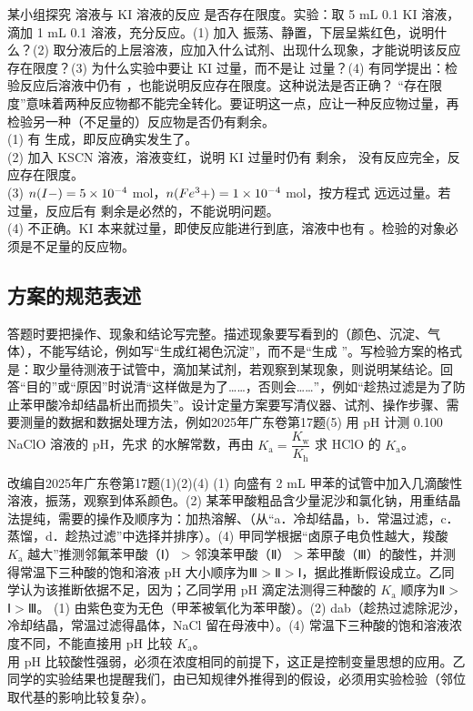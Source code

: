 \begin{liti}[综合·反应限度的探究]
某小组探究  溶液与 KI 溶液的反应  是否存在限度。实验：取 5 mL 0.1\molL{} KI 溶液，滴加 1 mL 0.1\molL{}  溶液，充分反应。(1) 加入  振荡、静置，下层呈紫红色，说明什么？(2) 取分液后的上层溶液，应加入什么试剂、出现什么现象，才能说明该反应存在限度？(3) 为什么实验中要让 KI 过量，而不是让  过量？(4) 有同学提出：检验反应后溶液中仍有 ，也能说明反应存在限度。这种说法是否正确？
\tcblower
\silu “存在限度”意味着两种反应物都不能完全转化。要证明这一点，应让一种反应物过量，再检验另一种（不足量的）反应物是否仍有剩余。\\
\jie (1) 有  生成，即反应确实发生了。\\
(2) 加入 KSCN 溶液，溶液变红，说明 KI 过量时仍有  剩余， 没有反应完全，反应存在限度。\\
(3) $n(I-)=5\times10^{-4}$ mol，$n(Fe^3+)=1\times10^{-4}$ mol，按方程式  远远过量。若  过量，反应后有  剩余是必然的，不能说明问题。\\
(4) 不正确。KI 本来就过量，即使反应能进行到底，溶液中也有 。检验的对象必须是不足量的反应物。
\end{liti}

\subsection{方案的规范表述}

答题时要把操作、现象和结论写完整。描述现象要写看到的（颜色、沉淀、气体），不能写结论，例如写“生成红褐色沉淀”，而不是“生成 ”。写检验方案的格式是：取少量待测液于试管中，滴加某试剂，若观察到某现象，则说明某结论。回答“目的”或“原因”时说清“这样做是为了……，否则会……”，例如“趁热过滤是为了防止苯甲酸冷却结晶析出而损失”。设计定量方案要写清仪器、试剂、操作步骤、需要测量的数据和数据处理方法，例如2025年广东卷第17题(5) 用 pH 计测 0.100\molL{} NaClO 溶液的 pH，先求  的水解常数，再由 $K_\text{a}=\dfrac{K_\text{w}}{K_\text{h}}$ 求 HClO 的 $K_\text{a}$。

\begin{zhenti}{改编自2025年广东卷第17题(1)(2)(4)}
(1) 向盛有 2 mL 甲苯的试管中加入几滴酸性  溶液，振荡，观察到体系颜色\tk。(2) 某苯甲酸粗品含少量泥沙和氯化钠，用重结晶法提纯，需要的操作及顺序为：加热溶解、\tk（从“a．冷却结晶，b．常温过滤，c．蒸馏，d．趁热过滤”中选择并排序）。(4) 甲同学根据“卤原子电负性越大，羧酸 $K_\text{a}$ 越大”推测邻氟苯甲酸（Ⅰ）$>$邻溴苯甲酸（Ⅱ）$>$苯甲酸（Ⅲ）的酸性，并测得常温下三种酸的饱和溶液 pH 大小顺序为Ⅲ$>$Ⅱ$>$Ⅰ，据此推断假设成立。乙同学认为该推断依据不足，因为\tk；乙同学用 pH 滴定法测得三种酸的 $K_\text{a}$ 顺序为Ⅱ$>$Ⅰ$>$Ⅲ。
\tcblower
\daan (1) 由紫色变为无色（甲苯被氧化为苯甲酸）。(2) dab（趁热过滤除泥沙，冷却结晶，常温过滤得晶体，NaCl 留在母液中）。(4) 常温下三种酸的饱和溶液浓度不同，不能直接用 pH 比较 $K_\text{a}$。\\
\dianbo 用 pH 比较酸性强弱，必须在浓度相同的前提下，这正是控制变量思想的应用。乙同学的实验结果也提醒我们，由已知规律外推得到的假设，必须用实验检验（邻位取代基的影响比较复杂）。
\end{zhenti}

